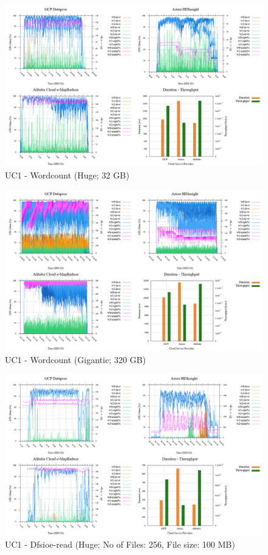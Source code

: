 \documentclass[review]{elsarticle}
\begin{document}
\begin{figure}[b]
	\caption{UC1 - Wordcount (Huge; 32 GB)}
	\includegraphics[width=\textwidth]{uc1-wrdcnt-h-cmidt}
	\centering
\end{figure}

\begin{figure}[b]
	\caption{UC1 - Wordcount (Gigantic; 320 GB)}
	\includegraphics[width=\textwidth]{uc1-wrdcnt-g-cmidt}
	\centering
\end{figure}

\begin{figure}[b]
	\caption{UC1 - Dfsioe-read (Huge; No of Files: 256, File size: 100 MB)}
	\includegraphics[width=\textwidth]{uc1-dfsioer-h-cmidt}
	\centering
\end{figure}
\end{document}
